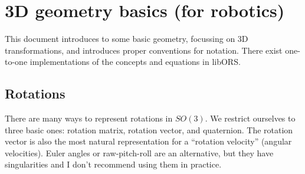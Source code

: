 


\section{3D geometry basics (for robotics)}

This document introduces to some basic geometry, focussing on 3D
transformations, and introduces proper conventions for notation. There
exist one-to-one implementations of the concepts and equations in
libORS.

\subsection{Rotations}

There are many ways to represent rotations in $SO(3)$. We restrict
ourselves to three basic ones: rotation matrix, rotation vector, and
quaternion. The rotation vector is also the most natural
representation for a ``rotation velocity'' (angular velocities). Euler
angles or raw-pitch-roll are an alternative, but they have
singularities and I don't recommend using them in practice.


